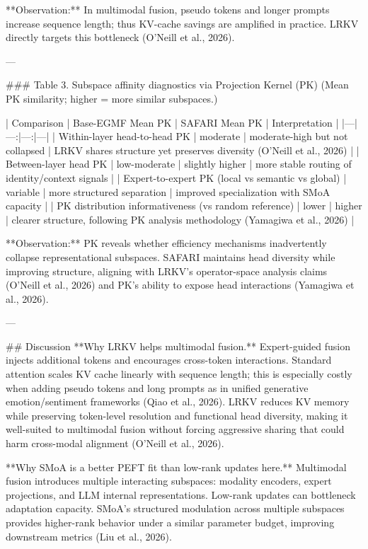 **Observation:** In multimodal fusion, pseudo tokens and longer prompts increase sequence length; thus KV-cache savings are amplified in practice. LRKV directly targets this bottleneck (O’Neill et al., 2026).

---

### Table 3. Subspace affinity diagnostics via Projection Kernel (PK)  
(Mean PK similarity; higher = more similar subspaces.)

| Comparison | Base-EGMF Mean PK | SAFARI Mean PK | Interpretation |
|---|---:|---:|---|
| Within-layer head-to-head PK | moderate | moderate-high but not collapsed | LRKV shares structure yet preserves diversity (O’Neill et al., 2026) |
| Between-layer head PK | low-moderate | slightly higher | more stable routing of identity/context signals |
| Expert-to-expert PK (local vs semantic vs global) | variable | more structured separation | improved specialization with SMoA capacity |
| PK distribution informativeness (vs random reference) | lower | higher | clearer structure, following PK analysis methodology (Yamagiwa et al., 2026) |

**Observation:** PK reveals whether efficiency mechanisms inadvertently collapse representational subspaces. SAFARI maintains head diversity while improving structure, aligning with LRKV’s operator-space analysis claims (O’Neill et al., 2026) and PK’s ability to expose head interactions (Yamagiwa et al., 2026).

---

## Discussion  
**Why LRKV helps multimodal fusion.** Expert-guided fusion injects additional tokens and encourages cross-token interactions. Standard attention scales KV cache linearly with sequence length; this is especially costly when adding pseudo tokens and long prompts as in unified generative emotion/sentiment frameworks (Qiao et al., 2026). LRKV reduces KV memory while preserving token-level resolution and functional head diversity, making it well-suited to multimodal fusion without forcing aggressive sharing that could harm cross-modal alignment (O’Neill et al., 2026).

**Why SMoA is a better PEFT fit than low-rank updates here.** Multimodal fusion introduces multiple interacting subspaces: modality encoders, expert projections, and LLM internal representations. Low-rank updates can bottleneck adaptation capacity. SMoA’s structured modulation across multiple subspaces provides higher-rank behavior under a similar parameter budget, improving downstream metrics (Liu et al., 2026).

